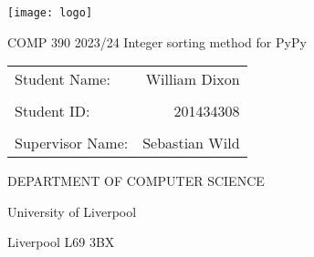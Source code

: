 \documentclass[12pt]{article}
\begin{document}
    \begin{center}
      
    
    \texttt{[image: logo]}
    \vspace{2cm}
    \begin{LARGE}
      \linebreak
      COMP 390
      \vspace{.8cm}
      \linebreak
      \vspace{1.5cm}
      2023/24
      \linebreak     
      Integer sorting method for PyPy   
    \end{LARGE}
    \linebreak   
    \vspace{2.5cm}
    \begin{table}[h]
      \begin{large}
        
        \centering
        \begin{tabularx}{.7\linewidth}{Xr}
          
          Student Name: & William Dixon \\
          & \\
          Student ID: & 201434308\\
          & \\
          Supervisor Name: & Sebastian Wild
        \end{tabularx}
        
      \end{large}
      \end{table}
      \vspace{1cm}
      
    \begin{LARGE}
      
      DEPARTMENT OF\linebreak      
      COMPUTER SCIENCE
      \vspace{4.5cm}
      
    \end{LARGE}
    \begin{large}
      
      University of Liverpool
      
      Liverpool L69 3BX
    \end{large}
      
  \end{center}
  \pagebreak
\end{document}
